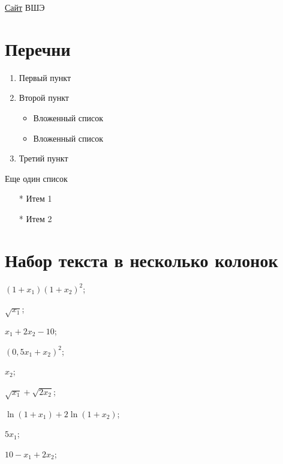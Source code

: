 \documentclass[a4paper,14pt]{article}       %
\begin{document}
\href{http://hse.ru}{Сайт} ВШЭ

\section{Перечни}

\begin{enumerate}
    \item Первый пункт
    \item Второй пункт
    \begin{itemize}
        \item Вложенный список
        \item Вложенный список
    \end{itemize}
    \item Третий пункт
\end{enumerate}

Еще один список
\begin{itemize}
    \item[*] Итем 1
    \item[*] Итем 2
\end{itemize}

\section{Набор текста в несколько колонок}

\begin{enumerate}
    \begin{multicols}{3}
        \item $(1+x_1)(1+x_2)^2$;
        \item $\sqrt{x_1}$;
        \item $x_1+2x_2-10$;
        \item $(0{,}5x_1+x_2)^2$;
        \item $x_2$;
        \item $\sqrt{x_1}+\sqrt{2x_2}$;
        \item $\ln(1+x_1)+2\ln(1+x_2)$;
        \item $5x_1$;
        \item $10-x_1+2x_2$;
    \end{multicols}
\end{enumerate}
\end{document}
